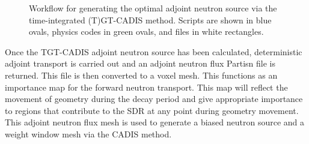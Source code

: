 \begin{figure}
\begin{tikzpicture}[every text node part/.style={align=center}]
        \end{tikzpicture}

	\caption [Workflow to generate TGT-CADIS adjoint neutron source]
	{Workflow for generating the optimal
	adjoint neutron source via the time-integrated (T)GT-CADIS method.  Scripts are shown in
	blue ovals, physics codes in green ovals, and files in white
	rectangles.\label{fig:gen_q_n_+}}
\end{figure}


Once the TGT-CADIS adjoint neutron source has been calculated, deterministic
adjoint transport is carried out and an adjoint neutron flux Partisn file is
returned.  This file is then converted to a voxel mesh.
This functions as an importance map for the forward neutron transport.
This map will reflect the movement of geometry during the decay period and give
appropriate importance to regions that contribute to the SDR at any point
during geometry movement.
This adjoint neutron flux mesh is used to generate a biased neutron source and a 
weight window mesh via the CADIS method.

